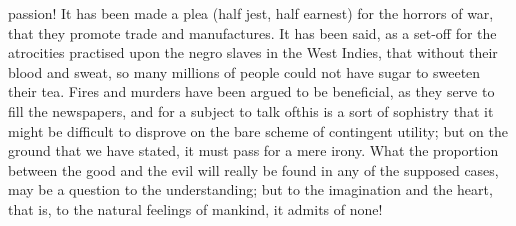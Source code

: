 passion! It has been made a plea (half jest, half earnest) for the
horrors of war, that they promote trade and manufactures. It has
been said, as a set-off for the atrocities practised upon the
negro slaves in the West Indies, that without their blood and
sweat, so many millions of people could not have sugar to sweeten
their tea. Fires and murders have been argued to be beneficial, as
they serve to fill the newspapers, and for a subject to talk
of\textemdash this is a sort of sophistry that it might be
difficult to disprove on the bare scheme of contingent utility;
but on the ground that we have stated, it must pass for a mere
irony. What the proportion between the good and the evil will
really be found in any of the supposed cases, may be a question to
the understanding; but to the imagination and the heart, that is,
to the natural feelings of mankind, it admits of none!

